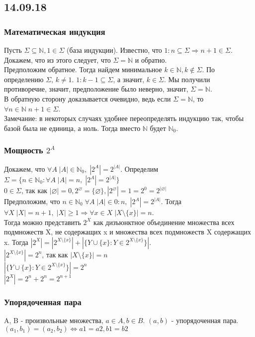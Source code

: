 \subsection{14.09.18}
\subsubsection{Математическая индукция}
Пусть $\Sigma \subseteq \mathbb{N}, 1 \in \Sigma$ (база индукции). Известно, что $1:n \subseteq \Sigma \Rightarrow n + 1 \in \Sigma$. Докажем, что из этого следует, что $\Sigma = \mathbb{N}$ и обратно.\\
Предположим обратное. Тогда найдем минимальное $k \in \mathbb{N}, k \not\in \Sigma$. По определению $\Sigma$, $k \not= 1$. $1:k - 1 \subseteq \Sigma$, а значит, $k \in \Sigma$. Мы получили противоречие, значит, предположение было неверно, значит, $\Sigma = \mathbb{N}$.\\
В обратную сторону доказывается очевидно, ведь если $\Sigma = \mathbb{N}$, то $\forall n \in \mathbb{N} \; n + 1 \in \Sigma$.\\
Замечание: в некоторых случаях удобнее переопределять индукцию так, чтобы базой была не единица, а ноль. Тогда вместо $\mathbb{N}$ будет $\mathbb{N}_0$.
\subsubsection{Мощность $2^A$}
Докажем, что $\forall A \; |A| \in \mathbb{N}_0 , \; |2^A| = 2^{|A|}$. Определим $\Sigma = \{n \in \mathbb{N}_0 : \forall A \; |A| = n , \; |2^A| = 2^{|A|}\}$\\
$0 \in \Sigma$, так как $|\varnothing| = 0, 2^{\varnothing} = \{\varnothing\}, |2^{\varnothing}| = 1 = 2^0 = 2^{|\varnothing|}$ \\
Предположим, что $n \in \mathbb{N}_0 \; \forall A \; |A| \in 0:n , \; |2^A| = 2^{|A|}$. Тогда $\forall X \;  |X| = n + 1 , \; |X| \geq 1 \Rightarrow \forall x \in X \; |X \setminus \{x\}| = n$. \\
Тогда можно представить $2^X$ как дизъюнктное объединение множества всех подмножеств X, не содержащих x и множества всех подмножеств X содержащих x. Тогда $|2^X| = |2^{X \setminus \{x\}}| + |{\{Y \cup \{x\} : Y \in 2^{X \setminus \{x\}}\}}|$. \\
$|2^{X \setminus \{x\}}| = 2^n$, так как $|X \setminus \{x\}| = n$ \\
$|\{Y \cup \{x\} : Y \in 2^{X \setminus \{x\}}\}| = 2^n$ \\
$|2^X| = 2^n + 2^n = 2^{n + 1}$
\subsubsection{Упорядоченная пара}
A, B - произвольные множества, $a \in A, b \in B$. $(a, b)$ - упорядоченная пара. $(a_1, b_1) = (a_2, b_2) \Leftrightarrow a1 = a2, b1 = b2$
